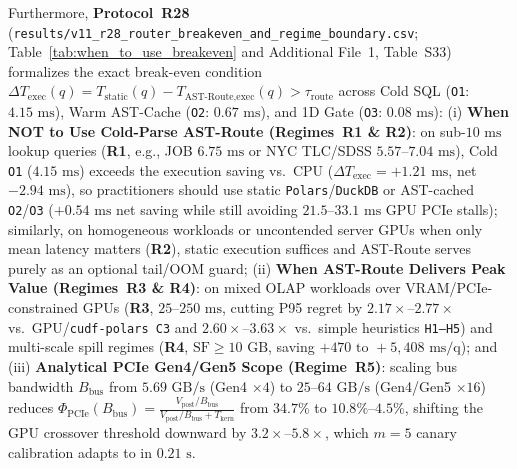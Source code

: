 \documentclass[10pt,a4paper]{article}
\begin{document}
Furthermore, \textbf{Protocol~R28} (\texttt{results/v11\_r28\_router\_breakeven\_and\_regime\_boundary.csv}; Table~\ref{tab:when_to_use_breakeven} and Additional File~1, Table~S33) formalizes the exact break-even condition $\Delta T_{\text{exec}}(q) = T_{\text{static}}(q) - T_{\text{AST-Route,exec}}(q) > \tau_{\text{route}}$ across Cold SQL (\texttt{O1}: $4.15\text{ ms}$), Warm AST-Cache (\texttt{O2}: $0.67\text{ ms}$), and 1D Gate (\texttt{O3}: $0.08\text{ ms}$): (i) \textbf{When NOT to Use Cold-Parse AST-Route (Regimes~R1 \& R2)}: on sub-$10\text{ ms}$ lookup queries (\textbf{R1}, e.g., JOB $6.75\text{ ms}$ or NYC TLC/SDSS $5.57\text{--}7.04\text{ ms}$), Cold \texttt{O1} ($4.15\text{ ms}$) exceeds the execution saving vs.\ CPU ($\Delta T_{\text{exec}}=+1.21\text{ ms}$, net $-2.94\text{ ms}$), so practitioners should use static \texttt{Polars}/\texttt{DuckDB} or AST-cached \texttt{O2}/\texttt{O3} ($+0.54\text{ ms}$ net saving while still avoiding $21.5\text{--}33.1\text{ ms}$ GPU PCIe stalls); similarly, on homogeneous workloads or uncontended server GPUs when only mean latency matters (\textbf{R2}), static execution suffices and AST-Route serves purely as an optional tail/OOM guard; (ii) \textbf{When AST-Route Delivers Peak Value (Regimes~R3 \& R4)}: on mixed OLAP workloads over VRAM/PCIe-constrained GPUs (\textbf{R3}, $25\text{--}250\text{ ms}$, cutting P95 regret by $2.17\times\text{--}2.77\times$ vs.\ GPU/\texttt{cudf-polars C3} and $2.60\times\text{--}3.63\times$ vs.\ simple heuristics \texttt{H1--H5}) and multi-scale spill regimes (\textbf{R4}, $\text{SF}\ge 10\text{ GB}$, saving $+470\text{ to }+5{,}408\text{ ms/q}$); and (iii) \textbf{Analytical PCIe Gen4/Gen5 Scope (Regime~R5)}: scaling bus bandwidth $B_{\text{bus}}$ from $5.69\text{ GB/s}$ (Gen4 $\times 4$) to $25\text{--}64\text{ GB/s}$ (Gen4/Gen5 $\times 16$) reduces $\Phi_{\text{PCIe}}(B_{\text{bus}}) = \frac{V_{\text{post}}/B_{\text{bus}}}{V_{\text{post}}/B_{\text{bus}}+T_{\text{kern}}}$ from $34.7\%$ to $10.8\%\text{--}4.5\%$, shifting the GPU crossover threshold downward by $3.2\times\text{--}5.8\times$, which $m=5$ canary calibration adapts to in $0.21\text{ s}$.
\end{document}
